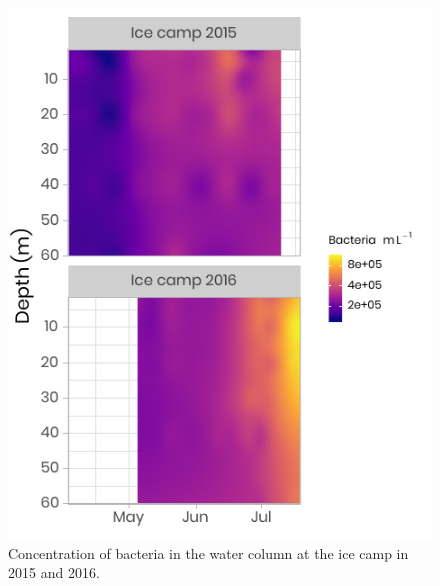 \documentclass[12pt,a4paper]{scrartcl}
\begin{document}
\begin{figure}[h]
	\centering
	\includegraphics[scale = 1]{../../../graphs/fig09.pdf}
	\caption{Concentration of bacteria in the water column at the ice camp in 2015 and 2016.}
\end{figure}

\clearpage
\newpage
\end{document}
